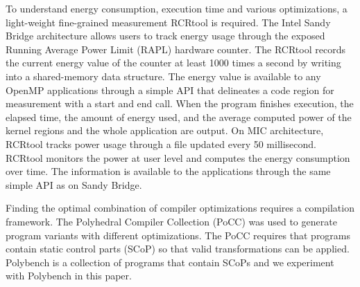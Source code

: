 To understand energy consumption, execution time and various optimizations,
a light-weight fine-grained measurement RCRtool is required. 
The Intel Sandy Bridge architecture allows users to track energy usage through 
the exposed Running Average Power Limit (RAPL) hardware counter. 
The RCRtool records the current energy value of the counter at least 1000 times a second by writing 
into a shared-memory data structure. %
The energy value is available to any OpenMP applications through a simple API that 
delineates a code region for measurement with a start and end call.
When the program finishes execution,
the elapsed time, the amount of energy used, and the average computed
power of the kernel regions and the whole application are output. 
On MIC architecture, RCRtool tracks power usage through 
a file updated every 50 millisecond.
RCRtool monitors the power at user level and computes the energy
consumption over time. The information is available to the applications 
through the same simple API as on Sandy Bridge.

Finding the optimal combination of compiler optimizations 
requires a compilation framework.
The Polyhedral Compiler Collection (PoCC) was used to generate program 
variants with different optimizations. 
The PoCC requires that programs contain static control parts (SCoP) so that 
valid transformations can be applied. Polybench is a collection of programs
that contain SCoPs and we experiment with Polybench in this paper. 
